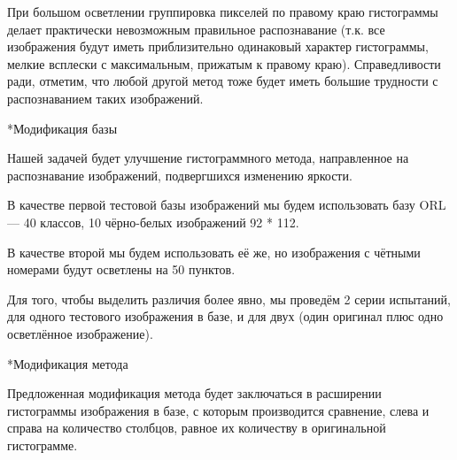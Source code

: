 \documentclass[a4paper,12pt,titlpage]{posobie}
\makeatletter
\renewcommand{\subsection}{\@startsection{subsection}{2}{0.0cm}{0.3cm}{0.1cm}%
             {\fontsize{14}{16}\bf\selectfont }}
\makeatother
\begin{document}
При большом осветлении группировка пикселей по правому краю гистограммы делает практически невозможным правильное распознавание (т.к. все изображения будут иметь приблизительно одинаковый характер гистограммы, мелкие всплески с максимальным, прижатым к правому краю). Справедливости ради, отметим, что любой другой метод тоже будет иметь большие трудности с распознаванием таких изображений. 

\subsection*{Модификация базы}

Нашей задачей будет улучшение гистограммного метода, направленное на распознавание изображений, подвергшихся изменению яркости. 

В качестве первой тестовой базы изображений мы будем использовать базу ORL — 40 классов, 10 чёрно-белых изображений 92 * 112.

В качестве второй мы будем использовать её же, но изображения с чётными номерами будут осветлены на 50 пунктов.

Для того, чтобы выделить различия более явно, мы проведём 2 серии испытаний, для одного тестового изображения в базе, 
и для двух (один оригинал плюс одно осветлённое изображение).

\subsection*{Модификация метода}

Предложенная модификация метода будет заключаться в расширении гистограммы изображения в базе, с которым производится сравнение, слева и справа на количество столбцов, равное их количеству в оригинальной гистограмме. 
\end{document}
